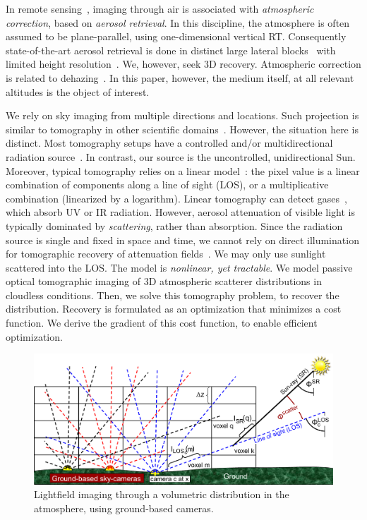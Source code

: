 \documentclass[10pt,letterpaper]{article}
\newcommand{\yoavcomment}[1]{}
\renewcommand{\yoavcomment}[1]{#1} %
\begin{document}
In remote sensing~\cite{Mishchenko2007}, imaging through air is
associated with {\em atmospheric correction}, based on {\em aerosol
  retrieval}. In this discipline, the atmosphere is often assumed to
be plane-parallel, using one-dimensional vertical RT. Consequently
state-of-the-art aerosol retrieval is done in distinct large lateral
blocks~\cite{Martonchikc} with limited height
resolution~\cite{kalashnikova}. We, however, seek 3D
recovery. Atmospheric correction is related to
dehazing~\cite{Namer2009}. In this paper, however, the medium itself,
at all relevant altitudes is the object of interest.


We rely on sky imaging from multiple directions and locations. Such
projection is similar to tomography in other scientific
domains~\cite{Bluestone2001}. However, the situation here is
distinct. Most tomography setups have a controlled and/or
multidirectional radiation source~\cite{Boas2001,messer}. In
contrast, our source is the uncontrolled, unidirectional
Sun. Moreover, typical tomography relies on a linear
model~\cite{gregson}: the pixel value is a linear combination of
components along a line of sight (LOS), or a multiplicative
combination (linearized by a logarithm). Linear tomography can detect
gases~\cite{Cosofret2009}, which absorb UV or IR radiation. However,
aerosol attenuation of visible light is typically dominated by {\em
  scattering}, rather than absorption. Since the radiation source is
single and fixed in space and time, we cannot rely on direct
illumination for tomographic recovery of attenuation
fields~\cite{Aviles2011}. We may only use sunlight scattered into the
LOS. The model is {\em nonlinear, yet tractable}. We model passive
optical tomographic imaging of 3D atmospheric scatterer distributions
in cloudless conditions. Then, we solve this tomography problem, to
recover the distribution. Recovery is formulated as an optimization
that minimizes a cost function. We derive the gradient of this cost
function, to enable efficient optimization.
\begin{figure}[t!]
  \begin{center}
    \yoavcomment{\includegraphics[width=\linewidth]{images/groundtomog24.pdf}}
  \end{center}
  \caption{\small Lightfield imaging through a volumetric distribution
    in the atmosphere, using ground-based cameras.}
  \label{fig:groundgrid}
\end{figure}
\end{document}
